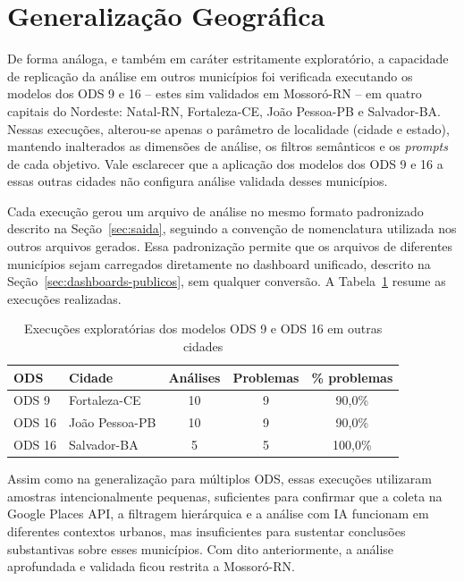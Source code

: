 \section{Generalização Geográfica}
\label{sec:generalizacao-geografica}

De forma análoga, e também em caráter estritamente exploratório, a capacidade de replicação da análise em outros municípios foi verificada executando os modelos dos ODS 9 e 16 -- estes sim validados em Mossoró-RN -- em quatro capitais do Nordeste: Natal-RN, Fortaleza-CE, João Pessoa-PB e Salvador-BA. Nessas execuções, alterou-se apenas o parâmetro de localidade (cidade e estado), mantendo inalterados as dimensões de análise, os filtros semânticos e os \textit{prompts} de cada objetivo. Vale esclarecer que a aplicação dos modelos dos ODS 9 e 16 a essas outras cidades não configura análise validada desses municípios.

Cada execução gerou um arquivo de análise no mesmo formato padronizado descrito na Seção~\ref{sec:saida}, seguindo a convenção de nomenclatura utilizada nos outros arquivos gerados. Essa padronização permite que os arquivos de diferentes municípios sejam carregados diretamente no dashboard unificado, descrito na Seção~\ref{sec:dashboards-publicos}, sem qualquer conversão. A Tabela~\ref{tab:generalizacao-geografica} resume as execuções realizadas.

\begin{table}[h!]
    \centering
    \caption{Execuções exploratórias dos modelos ODS 9 e ODS 16 em outras cidades}
    \label{tab:generalizacao-geografica}
    \begin{tabular}{llccc}
        \hline
        \textbf{ODS} & \textbf{Cidade} & \textbf{Análises} & \textbf{Problemas} & \textbf{\% problemas} \\
        \hline
        ODS 9 & Fortaleza-CE & 10 & 9 & 90,0\% \\
        ODS 16 & João Pessoa-PB & 10 & 9 & 90,0\% \\
        ODS 16 & Salvador-BA & 5 & 5 & 100,0\% \\
        \hline
    \end{tabular}
\end{table}

Assim como na generalização para múltiplos ODS, essas execuções utilizaram amostras intencionalmente pequenas, suficientes para confirmar que a coleta na Google Places API, a filtragem hierárquica e a análise com IA funcionam em diferentes contextos urbanos, mas insuficientes para sustentar conclusões substantivas sobre esses municípios. Com dito anteriormente, a análise aprofundada e validada ficou restrita a Mossoró-RN.

